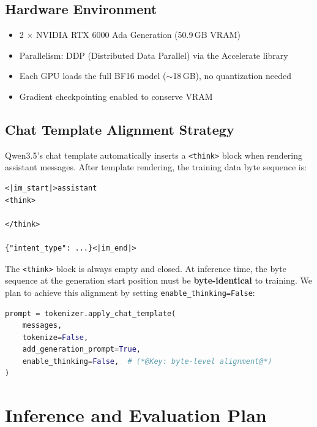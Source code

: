 \documentclass[12pt, a4paper]{article}
\begin{document}
\subsection{Hardware Environment}

\begin{itemize}
  \item 2 $\times$ NVIDIA RTX 6000 Ada Generation (50.9\,GB VRAM)
  \item Parallelism: DDP (Distributed Data Parallel) via the Accelerate library
  \item Each GPU loads the full BF16 model ($\sim$18\,GB), no quantization needed
  \item Gradient checkpointing enabled to conserve VRAM
\end{itemize}

\subsection{Chat Template Alignment Strategy}
\label{sec:chat-template}

Qwen3.5's chat template automatically inserts a \texttt{<think>} block when rendering assistant messages. After template rendering, the training data byte sequence is:

\begin{lstlisting}[language={}, numbers=none]
<|im_start|>assistant
<think>

</think>

{"intent_type": ...}<|im_end|>
\end{lstlisting}

\noindent
The \texttt{<think>} block is always empty and closed. At inference time, the byte sequence at the generation start position must be \textbf{byte-identical} to training. We plan to achieve this alignment by setting \texttt{enable\_thinking=False}:

\begin{lstlisting}[language=Python, caption={Chat template alignment at inference}]
prompt = tokenizer.apply_chat_template(
    messages,
    tokenize=False,
    add_generation_prompt=True,
    enable_thinking=False,  # (*@Key: byte-level alignment@*)
)
\end{lstlisting}

\section{Inference and Evaluation Plan}
\label{sec:eval}
\end{document}
